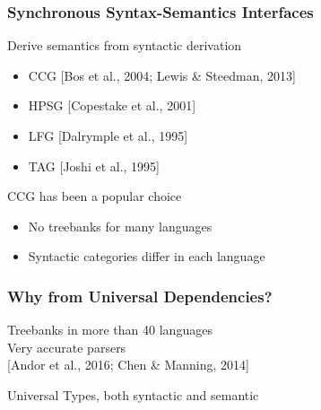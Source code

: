 \documentclass[mathserif,12pt]{beamer}
\begin{document}
\begin{frame}
\begin{center}
\end{center} 
\end{frame}

\begin{frame}
 \frametitle{Synchronous Syntax-Semantics Interfaces}
 Derive semantics from syntactic derivation
 \begin{itemize}
  \vspace{0.5em}
  \item CCG {\scriptsize [Bos et al., 2004; Lewis \& Steedman, 2013]}
  
  \vspace{0.5em}
  \item HPSG {\scriptsize [Copestake et al., 2001]}
  
  \vspace{0.5em}
  \item LFG {\scriptsize [Dalrymple et al., 1995]}
  
  \vspace{0.5em}
  \item TAG {\scriptsize [Joshi et al., 1995]}
 \end{itemize}
 
 \vspace{0.5cm}
 
 CCG has been a popular choice
 \vspace{0.5em}
 \begin{itemize}
  \item \alert{No treebanks} for many languages
  \item Syntactic categories differ in each language
 \end{itemize}
\end{frame}

\begin{frame}
 \frametitle{Why from Universal Dependencies?}
 Treebanks in more than 40 languages\\
 
 \vspace{1cm}
 Very accurate parsers\\
 {\scriptsize [Andor et al., 2016; Chen \& Manning, 2014]}
 
 \vspace{1cm}
 Universal Types, both syntactic and semantic\\
 
\end{frame}
\end{document}
